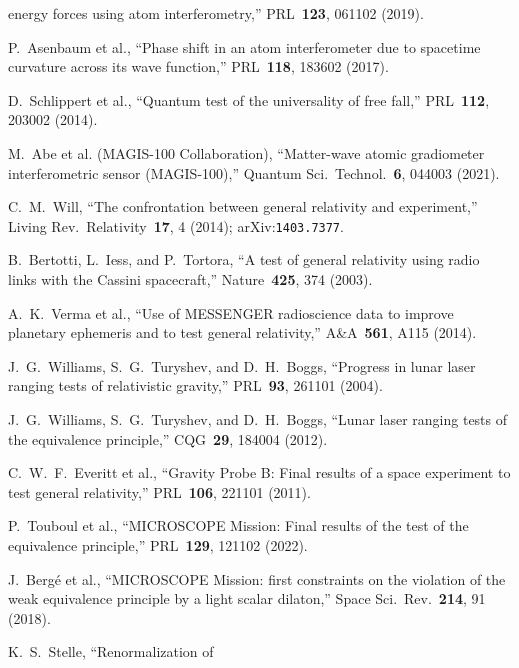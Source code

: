 \documentclass[11pt,a4paper]{article}
\begin{document}
\begin{enumerate}[label={[\arabic*]}, leftmargin=2em]
    energy forces using atom interferometry,'' PRL~\textbf{123}, 061102 (2019).
  \item\label{ref:asenbaum2017} P.~Asenbaum et al., ``Phase shift in an atom
    interferometer due to spacetime curvature across its wave function,''
    PRL~\textbf{118}, 183602 (2017).
  \item\label{ref:schlippert2014} D.~Schlippert et al., ``Quantum test of the
    universality of free fall,'' PRL~\textbf{112}, 203002 (2014).
  \item\label{ref:magis2021} M.~Abe et al. (MAGIS-100 Collaboration),
    ``Matter-wave atomic gradiometer interferometric sensor (MAGIS-100),''
    Quantum Sci.\ Technol.~\textbf{6}, 044003 (2021).
  \item\label{ref:will2014} C.~M.~Will, ``The confrontation between general
    relativity and experiment,'' Living Rev.\ Relativity~\textbf{17}, 4 (2014);
    arXiv:\texttt{1403.7377}.
  \item\label{ref:bertotti2003} B.~Bertotti, L.~Iess, and P.~Tortora, ``A test
    of general relativity using radio links with the Cassini spacecraft,''
    Nature~\textbf{425}, 374 (2003).
  \item\label{ref:verma2014} A.~K.~Verma et al., ``Use of MESSENGER
    radioscience data to improve planetary ephemeris and to test general
    relativity,'' A\&A~\textbf{561}, A115 (2014).
  \item\label{ref:williams2004} J.~G.~Williams, S.~G.~Turyshev, and
    D.~H.~Boggs, ``Progress in lunar laser ranging tests of relativistic
    gravity,'' PRL~\textbf{93}, 261101 (2004).
  \item\label{ref:williams2012} J.~G.~Williams, S.~G.~Turyshev, and
    D.~H.~Boggs, ``Lunar laser ranging tests of the equivalence principle,''
    CQG~\textbf{29}, 184004 (2012).
  \item\label{ref:everitt2011} C.~W.~F.~Everitt et al., ``Gravity Probe B:
    Final results of a space experiment to test general relativity,''
    PRL~\textbf{106}, 221101 (2011).
  \item\label{ref:touboul2022} P.~Touboul et al., ``MICROSCOPE Mission: Final
    results of the test of the equivalence principle,''
    PRL~\textbf{129}, 121102 (2022).
  \item\label{ref:berge2018} J.~Berg\'e et al., ``MICROSCOPE Mission:
    first constraints on the violation of the weak equivalence principle by a
    light scalar dilaton,'' Space Sci.\ Rev.~\textbf{214}, 91 (2018).
  \item\label{ref:stelle1977} K.~S.~Stelle, ``Renormalization of

\end{enumerate}
\end{document}
